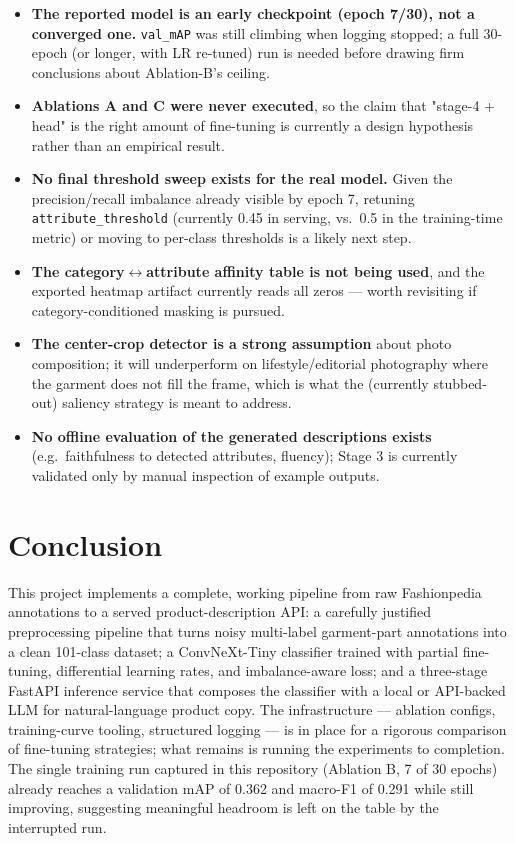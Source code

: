 \documentclass[11pt]{article}
\newcommand{\code}[1]{\texttt{\small #1}}
\begin{document}
\begin{itemize}
\item \textbf{The reported model is an early checkpoint (epoch 7/30), not a converged one.} \code{val\_mAP} was still climbing when logging stopped; a full 30-epoch (or longer, with LR re-tuned) run is needed before drawing firm conclusions about Ablation-B's ceiling.
\item \textbf{Ablations A and C were never executed}, so the claim that "stage-4 + head" is the right amount of fine-tuning is currently a design hypothesis rather than an empirical result.
\item \textbf{No final threshold sweep exists for the real model.} Given the precision/recall imbalance already visible by epoch 7, retuning \code{attribute\_threshold} (currently 0.45 in serving, vs.\ 0.5 in the training-time metric) or moving to per-class thresholds is a likely next step.
\item \textbf{The category$\leftrightarrow$attribute affinity table is not being used}, and the exported heatmap artifact currently reads all zeros --- worth revisiting if category-conditioned masking is pursued.
\item \textbf{The center-crop detector is a strong assumption} about photo composition; it will underperform on lifestyle/editorial photography where the garment does not fill the frame, which is what the (currently stubbed-out) saliency strategy is meant to address.
\item \textbf{No offline evaluation of the generated descriptions exists} (e.g.\ faithfulness to detected attributes, fluency); Stage 3 is currently validated only by manual inspection of example outputs.
\end{itemize}

\section{Conclusion}

This project implements a complete, working pipeline from raw Fashionpedia annotations to a served product-description API: a carefully justified preprocessing pipeline that turns noisy multi-label garment-part annotations into a clean 101-class dataset; a ConvNeXt-Tiny classifier trained with partial fine-tuning, differential learning rates, and imbalance-aware loss; and a three-stage FastAPI inference service that composes the classifier with a local or API-backed LLM for natural-language product copy. The infrastructure --- ablation configs, training-curve tooling, structured logging --- is in place for a rigorous comparison of fine-tuning strategies; what remains is running the experiments to completion. The single training run captured in this repository (Ablation B, 7 of 30 epochs) already reaches a validation mAP of 0.362 and macro-F1 of 0.291 while still improving, suggesting meaningful headroom is left on the table by the interrupted run.
\end{document}
